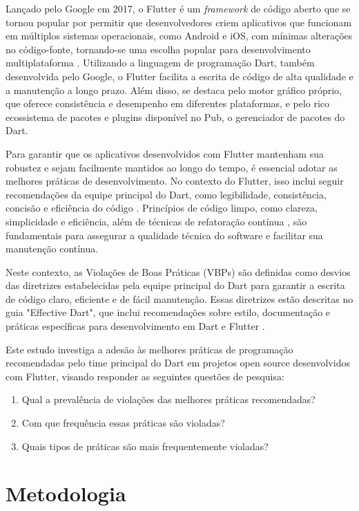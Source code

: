 \documentclass[12pt]{article}
\begin{document}
Lançado pelo Google em 2017, o Flutter é um \textit{framework} de código aberto que se tornou popular por permitir que desenvolvedores criem aplicativos que funcionam em múltiplos sistemas operacionais, como Android e iOS, com mínimas alterações no código-fonte, tornando-se uma escolha popular para desenvolvimento multiplataforma \cite{flutter}. Utilizando a linguagem de programação Dart, também desenvolvida pelo Google, o Flutter facilita a escrita de código de alta qualidade e a manutenção a longo prazo. Além disso, se destaca pelo motor gráfico próprio, que oferece consistência e desempenho em diferentes plataformas, e pelo rico ecossistema de pacotes e plugins disponível no Pub, o gerenciador de pacotes do Dart.

Para garantir que os aplicativos desenvolvidos com Flutter mantenham sua robustez e sejam facilmente mantidos ao longo do tempo, é essencial adotar as melhores práticas de desenvolvimento. No contexto do Flutter, isso inclui seguir recomendações da equipe principal do Dart, como legibilidade, consistência, concisão e eficiência do código \cite{dartBestPractices}. Princípios de código limpo, como clareza, simplicidade e eficiência, além de técnicas de refatoração contínua \cite{fowler1999refactoring}, são fundamentais para assegurar a qualidade técnica do software e facilitar sua manutenção contínua.

Neste contexto, as Violações de Boas Práticas (VBPs) são definidas como desvios das diretrizes estabelecidas pela equipe principal do Dart para garantir a escrita de código claro, eficiente e de fácil manutenção. Essas diretrizes estão descritas no guia "Effective Dart", que inclui recomendações sobre estilo, documentação e práticas específicas para desenvolvimento em Dart e Flutter \cite{dartBestPractices}.

Este estudo investiga a adesão às melhores práticas de programação recomendadas pelo time principal do Dart em projetos open source desenvolvidos com Flutter, visando responder as seguintes questões de pesquisa:
\begin{enumerate}
\item Qual a prevalência de violações das melhores práticas recomendadas?
\item Com que frequência essas práticas são violadas?
\item Quais tipos de práticas são mais frequentemente violadas?
\end{enumerate}

\section{Metodologia}
\end{document}
